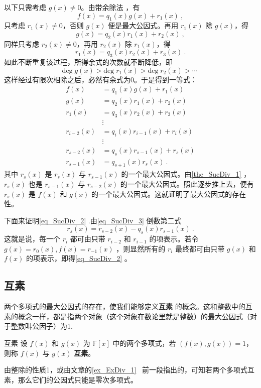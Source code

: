 以下只需考虑 $g(x)\neq 0$。由带余除法 ，有
\begin{equation}
f(x)=q_1(x)g(x)+r_1(x)~,
\end{equation}
只考虑 $r_1(x)\neq 0$，否则 $g(x)$ 便是最大公因式。再用 $r_1(x)$ 除 $g(x)$，得
\begin{equation}
g(x)=q_2(x)r_1(x)+r_2(x)~,
\end{equation}
同样只考虑 $r_2(x)\neq0$，再用 $r_2(x)$ 除 $r_1(x)$，得
\begin{equation}
r_1(x)=q_3(x)r_2(x)+r_3(x)~.
\end{equation}
如此不断重复该过程，所得余式的次数就不断降低，即
\begin{equation}
\mathrm{deg}\;g(x)>\mathrm{deg}\;r_1(x)>\mathrm{deg}\;r_2(x)>\cdots~
\end{equation}
这样经过有限次相除之后，必然有余式为0。于是得到一等式：
\begin{equation}\label{eq_SucDiv_3}
\begin{aligned}
f(x)&=q_1(x)g(x)+r_1(x)\\
g(x)&=q_2(x)r_1(x)+r_2(x)\\
r_1(x)&=q_3(x)r_2(x)+r_3(x)\\
&\vdots\\
r_{i-2}(x)&=q_i(x)r_{i-1}(x)+r_i(x)\\
&\vdots\\
r_{s-2}(x)&=q_s(x)r_{s-1}(x)+r_s(x)\\
r_{s-1}(x)&=q_{s+1}(x)r_s(x)~.
\end{aligned}
\end{equation}
其中 $r_s(x)$ 是 $r_s(x)$ 与 $r_{s-1}(x)$ 的一个最大公因式。由\autoref{the_SucDiv_1} ，$r_s(x)$ 也是 $r_{s-1}(x)$ 与 $r_{s-2}(x)$ 的一个最大公因式。照此逐步推上去，便有 $r_s(x)$ 是 $f(x)$ 和 $g(x)$ 的一个最大公因式。这就证明了最大公因式的存在性。

下面来证明\autoref{eq_SucDiv_2} .由\autoref{eq_SucDiv_3} 倒数第二式
\begin{equation}
r_s(x)=r_{s-2}(x)-q_s(x)r_{s-1}(x)~.
\end{equation}
这就是说，每一个 $r_i$ 都可由只带 $r_{i-2}$ 和 $r_{i-1}$ 的项表示。若令 $g(x)=r_0(x),f(x)=r_{-1}(x)$ ，则显然所有的 $r_i$ 最终都可由只带 $g(x)$ 和 $f(x)$ 的项表示，即得\autoref{eq_SucDiv_2} 。
\subsection{互素}
两个多项式的最大公因式的存在，使我们能够定义\textbf{互素} 的概念。这和整数中的互素的概念一样，都是指两个对象（这个对象在数论里就是整数）的最大公因式（对于整数叫公因子）为1.
\begin{definition}{互素}
设 $f(x)$ 和 $g(x)$ 为 $\mathbb{F}[x]$ 中的两个多项式，若 $(f(x),g(x))=1$，则称 $f(x)$ 与 $g(x)$ \textbf{互素}。
\end{definition}
由整除的性质1，或由文章的\autoref{ex_ExDiv_1}~ 前一段指出的，可知若两个多项式互素，那么它们的公因式只能是零次多项式。

